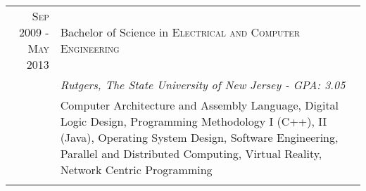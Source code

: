 \documentclass[a4paper,10pt, onepage]{article} %
\begin{document}
\begin{tabular}{r|p{10cm}}	
\textsc{Sep 2009 - May 2013} & Bachelor of Science in \textsc{Electrical and Computer Engineering}\\
& \small\emph{Rutgers, The State University of New Jersey -  GPA: 3.05}\\
& \footnotesize{Computer Architecture and Assembly Language, Digital Logic Design, Programming Methodology I (C++), II (Java), Operating System Design, Software Engineering, Parallel and Distributed Computing, Virtual Reality, Network Centric Programming}\\
\multicolumn{2}{c}{}\\

\end{tabular}



\end{document}
